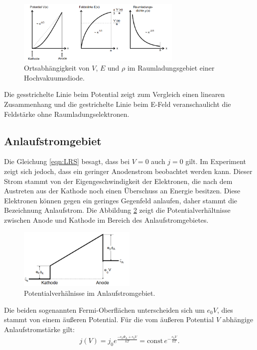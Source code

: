 \begin{figure}
 \centering
 \includegraphics[width=0.7\textwidth]{verlauf.png}
 \caption{Ortsabhängigkeit von $V$, $E$ und $\rho$ im Raumladungsgebiet einer Hochvakuumsdiode.\cite{sample}}
 \label{fig:verlauf}
 \end{figure}
 \FloatBarrier
Die gesstrichelte Linie beim Potential zeigt zum Vergleich einen linearen Zusammenhang
und die gestrichelte Linie beim E-Feld veranschaulicht die Feldstärke ohne Raumladungselektronen.

\subsection{Anlaufstromgebiet}
Die Gleichung \eqref{eqn:LRS} besagt, dass bei $V=0$ auch $j=0$ gilt. Im Experiment zeigt sich jedoch,
dass ein geringer Anodenstrom beobachtet werden kann. Dieser Strom stammt von der Eigengeschwindigkeit
der Elektronen, die nach dem Austreten aus der Kathode noch einen Überschuss an Energie besitzen.
Diese Elektronen können gegen ein geringes Gegenfeld anlaufen, daher stammt die Bezeichnung Anlaufstrom.
Die Abbildung \ref{fig:pv} zeigt die Potentialverhältnisse zwischen Anode und Kathode im Bereich des Anlaufstromgebietes.
\begin{figure}
 \centering
 \includegraphics[width=0.5\textwidth]{pv.png}
 \caption{Potentialverhälnisse im Anlaufstromgebiet.\cite{sample}}
 \label{fig:pv}
 \end{figure}
Die beiden sogenannten Fermi-Oberflächen unterscheiden sich um $e_\mathrm{0}V$, dies stammt von einem
äußeren Potential. Für die vom äußeren Potential $V$  abhängige Anlaufstromstärke gilt:
\begin{align}
j(V)=j_\mathrm{0}e^{\frac{-e_\mathrm{0}\Phi_\mathrm{A}+e_\mathrm{0}V}{kT}}=\mathrm{const} \, e^{-\frac{e_\mathrm{0}V}{kT}}\label{eqn:pot}.
\end{align}

